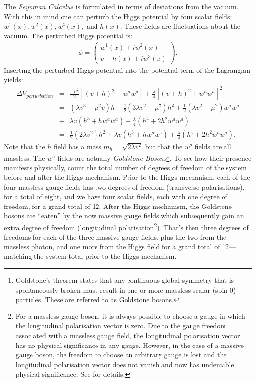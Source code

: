 The \emph{Feynman Calculus} is formulated in terms of deviations from the vacuum. With this in mind one can perturb the Higgs potential by four scalar fields: $w^{1}(x),w^{2}(x),w^{3}(x),$ and $h(x)$. These fields are fluctuations about the vacuum. The perturbed Higgs potential is:
\begin{eqnarray}
\phi =
	\begin{pmatrix}
	w^{1}(x) + iw^{2}(x) \\
	v + h(x) + iw^{3}(x)
	\end{pmatrix}.
\end{eqnarray}
Inserting the perturbed Higgs potential into the potential term of the Lagrangian yields:
\begin{eqnarray}
\Delta V_{perturbation} &=& \frac{-\mu^{2}}{2} \left[ \left( v + h \right)^{2} + w^{a}w^{a} \right] + \frac{\lambda}{4} \left[ \left( v + h \right)^{2} + w^{a}w^{a} \right]^{2} \nonumber \\
&=& \left( \lambda v^{3} - \mu^{2} v \right)h + \frac{1}{2} \left( 3 \lambda v^{2} - \mu^{2} \right)h^{2} + \frac{1}{2} \left( \lambda v^{2} - \mu^{2} \right) w^{a} w^{a} \nonumber \\
&+& \lambda v \left( h^{3} + hw^{a}w^{a} \right) + \frac{\lambda}{4} \left( h^{4} +2h^{2} w^{a} w^{a} \right) \nonumber \\
&=& \frac{1}{2} \left( 2 \lambda v^{2} \right) h^{2} + \lambda v \left( h^{3} + hw^{a}w^{a} \right) + \frac{\lambda}{4} \left( h^{4} + 2 h^{2}w^{a}w^{a} \right).
\end{eqnarray}
Note that the $h$ field has a mass $m_{h} = \sqrt{2 \lambda v^{2}}$ but that the $w^{a}$ fields are all massless. The $w^{a}$ fields are actually \emph{Goldstone Bosons}\footnote{Goldstone's theorem states that any continuous global symmetry that is spontaneously broken must result in one or more massless scalar (spin-0) particles. These are referred to as Goldstone bosons.}. To see how their presence manifests physically, count the total number of degrees of freedom of the system before and after the Higgs mechanism. Prior to the Higgs mechanism, each of the four massless gauge fields has two degrees of freedom (transverse polarisations), for a total of eight, and we have four scalar fields, each with one degree of freedom, for a grand total of 12. After the Higgs mechanism, the Goldstone bosons are ``eaten'' by the now massive gauge fields which subsequently gain an extra degree of freedom (longitudinal polarisation\footnote{For a massless gauge boson, it is always possible to choose a gauge in which the longitudinal polarisation vector is zero. Due to the gauge freedom associated with a massless gauge field, the longitudinal polarisation vector has no physical significance in any gauge. However, in the case of a massive gauge boson, the freedom to choose an arbitrary gauge is lost and the longitudinal polarisation vector does not vanish and now has undeniable physical significance. See \cite{schwartz} for details.}). That's then three degrees of freedoms for each of the three massive gauge fields, plus the two from the massless photon, and one more from the Higgs field for a grand total of 12---matching the system total prior to the Higgs mechanism.
